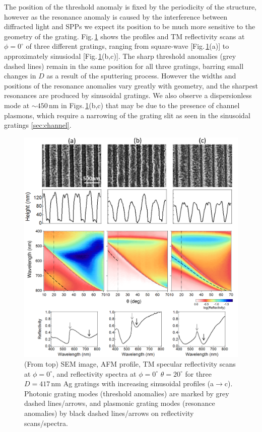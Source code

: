 The position of the threshold anomaly is fixed by the periodicity of the structure, however as the resonance anomaly is caused by the interference between diffracted light and SPPs we expect its position to be much more sensitive to the geometry of the grating. Fig.\,\ref{7Fig10} shows the profiles and TM reflectivity scans at $\phi=0^{\circ}$ of three different gratings, ranging from square-wave [Fig.\,\ref{7Fig10}(a)] to approximately sinusiodal [Fig.\,\ref{7Fig10}(b,c)]. The sharp threshold anomalies (grey dashed lines) remain in the same position for all three gratings, barring small changes in $D$ as a result of the sputtering process. However the widths and positions of the resonance anomalies vary greatly with geometry, and the sharpest resonances are produced by sinusoidal gratings. We also observe a dispersionless mode at $\sim450$\,nm in Figs.\,\ref{7Fig10}(b,c) that may be due to the presence of channel plasmons, which require a narrowing of the grating slit as seen in the sinusoidal gratings \ref{sec:channel}.
\begin{figure}[h!p] 
\centering    
\includegraphics[width=\textwidth]{Fig10}
\caption[Effect of grating geometry on the optical spectra of $D=417$\,nm Ag gratings.] {(From top) SEM image, AFM profile, TM specular reflectivity scans at $\phi=0^{\circ}$, and reflectivity spectra at $\phi=0^{\circ}$ $\theta=20^{\circ}$ for three $D=417$\,nm Ag gratings with increasing sinusoidal profiles (a$\rightarrow$c). Photonic grating modes (threshold anomalies) are marked by grey dashed lines/arrows, and plasmonic grating modes (resonance anomalies) by black dashed lines/arrows on reflectivity scans/spectra.}
\label{7Fig10}
\end{figure}

